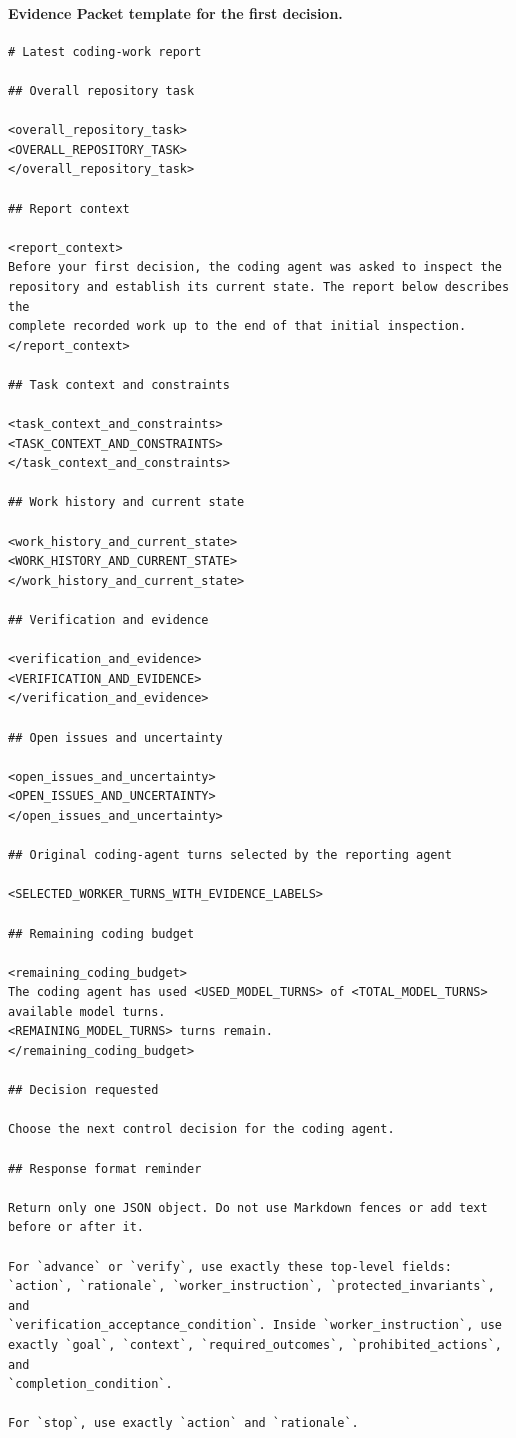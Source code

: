 \paragraph{Evidence Packet template for the first decision.}
\mbox{}\par\nobreak
\begin{lstlisting}[style=looparenaprompt]
# Latest coding-work report

## Overall repository task

<overall_repository_task>
<OVERALL_REPOSITORY_TASK>
</overall_repository_task>

## Report context

<report_context>
Before your first decision, the coding agent was asked to inspect the
repository and establish its current state. The report below describes the
complete recorded work up to the end of that initial inspection.
</report_context>

## Task context and constraints

<task_context_and_constraints>
<TASK_CONTEXT_AND_CONSTRAINTS>
</task_context_and_constraints>

## Work history and current state

<work_history_and_current_state>
<WORK_HISTORY_AND_CURRENT_STATE>
</work_history_and_current_state>

## Verification and evidence

<verification_and_evidence>
<VERIFICATION_AND_EVIDENCE>
</verification_and_evidence>

## Open issues and uncertainty

<open_issues_and_uncertainty>
<OPEN_ISSUES_AND_UNCERTAINTY>
</open_issues_and_uncertainty>

## Original coding-agent turns selected by the reporting agent

<SELECTED_WORKER_TURNS_WITH_EVIDENCE_LABELS>

## Remaining coding budget

<remaining_coding_budget>
The coding agent has used <USED_MODEL_TURNS> of <TOTAL_MODEL_TURNS> available model turns.
<REMAINING_MODEL_TURNS> turns remain.
</remaining_coding_budget>

## Decision requested

Choose the next control decision for the coding agent.

## Response format reminder

Return only one JSON object. Do not use Markdown fences or add text
before or after it.

For `advance` or `verify`, use exactly these top-level fields:
`action`, `rationale`, `worker_instruction`, `protected_invariants`, and
`verification_acceptance_condition`. Inside `worker_instruction`, use
exactly `goal`, `context`, `required_outcomes`, `prohibited_actions`, and
`completion_condition`.

For `stop`, use exactly `action` and `rationale`.
\end{lstlisting}

